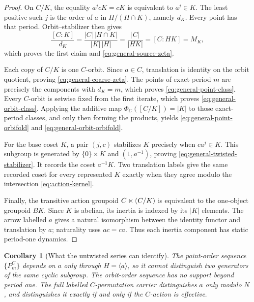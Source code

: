 \documentclass[11pt]{article}
\newtheorem{corollary}[theorem]{Corollary}
\theoremstyle{definition}
\theoremstyle{remark}
\begin{document}
\begin{proof}
On \(C/K\), the equality \(a^jcK=cK\) is equivalent to \(a^j\in K\).
The least positive such \(j\) is the order of \(a\) in \(H/(H\cap K)\),
namely \(d_K\).  Every point has that period.  Orbit--stabilizer then gives
\begin{equation}
  \frac{[C:K]}{d_K}
  =\frac{|C|\,|H\cap K|}{|K|\,|H|}
  =\frac{|C|}{|HK|}
  =[C:HK]=M_K,
  \label{eq:cycle-count-identity}
\end{equation}
which proves the first claim and \eqref{eq:general-source-zeta}.

Each copy of \(C/K\) is one \(C\)-orbit.  Since \(a\in C\), translation is
identity on the orbit quotient, proving \eqref{eq:general-coarse-zeta}.
The points of exact period \(m\) are precisely the components with
\(d_K=m\), which proves \eqref{eq:general-point-class}.  Every \(C\)-orbit is
setwise fixed from the first iterate, which proves
\eqref{eq:general-orbit-class}.  Applying the additive map
\(\Phi_C([C/K])=|K|\) to those exact-period classes, and only then forming
the products, yields \eqref{eq:general-point-orbifold} and
\eqref{eq:general-orbit-orbifold}.

For the base coset \(K\), a pair \((j,c)\) stabilizes \(K\) precisely when
\(ca^j\in K\).  This subgroup is generated by \(\{0\}\times K\) and
\((1,a^{-1})\), proving \eqref{eq:general-twisted-stabilizer}.  It records
the coset \(a^{-1}K\).  Two translation labels give the same recorded coset
for every represented \(K\) exactly when they agree modulo the intersection
\eqref{eq:action-kernel}.

Finally, the transitive action groupoid \(C\mathbin{\ltimes}(C/K)\) is
equivalent to the one-object groupoid \(BK\).  Since \(K\) is abelian, its
inertia is indexed by its \(|K|\) elements.  The arrow labelled \(a\) gives a
natural isomorphism between the identity functor and translation by \(a\);
naturality uses \(ac=ca\).  Thus each inertia component has static
period-one dynamics.
\end{proof}

\begin{corollary}[What the untwisted series can identify]
\label{cor:subgroup-only}
The point-order sequence \(\{P_m^C\}\) depends on \(a\) only through
\(H=\langle a\rangle\), so it cannot distinguish two generators of the same
cyclic subgroup.  The orbit-order sequence has no support beyond period one.
The full labelled \(C\)-permutation carrier distinguishes \(a\) only modulo
\(N\), and distinguishes it exactly if and only if the \(C\)-action is
effective.
\end{corollary}
\end{document}
